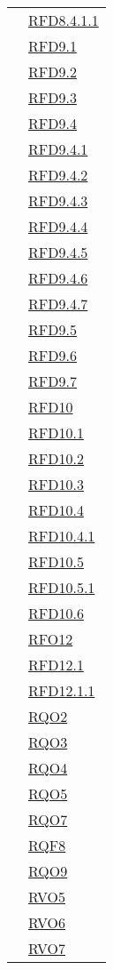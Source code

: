 \begin{longtable}{|>{\centering}m{5cm}|m{5cm}<{\centering}|}
& \hyperlink{RFD8.4.1.1}{RFD8.4.1.1}\\
& \hyperlink{RFD9.1}{RFD9.1}\\
& \hyperlink{RFD9.2}{RFD9.2}\\
& \hyperlink{RFD9.3}{RFD9.3}\\
& \hyperlink{RFD9.4}{RFD9.4}\\
& \hyperlink{RFD9.4.1}{RFD9.4.1}\\
& \hyperlink{RFD9.4.2}{RFD9.4.2}\\
& \hyperlink{RFD9.4.3}{RFD9.4.3}\\
& \hyperlink{RFD9.4.4}{RFD9.4.4}\\
& \hyperlink{RFD9.4.5}{RFD9.4.5}\\
& \hyperlink{RFD9.4.6}{RFD9.4.6}\\
& \hyperlink{RFD9.4.7}{RFD9.4.7}\\
& \hyperlink{RFD9.5}{RFD9.5}\\
& \hyperlink{RFD9.6}{RFD9.6}\\
& \hyperlink{RFD9.7}{RFD9.7}\\
& \hyperlink{RFD10}{RFD10}\\
& \hyperlink{RFD10.1}{RFD10.1}\\
& \hyperlink{RFD10.2}{RFD10.2}\\
& \hyperlink{RFD10.3}{RFD10.3}\\
& \hyperlink{RFD10.4}{RFD10.4}\\
& \hyperlink{RFD10.4.1}{RFD10.4.1}\\
& \hyperlink{RFD10.5}{RFD10.5}\\
& \hyperlink{RFD10.5.1}{RFD10.5.1}\\
& \hyperlink{RFD10.6}{RFD10.6}\\
& \hyperlink{RFO12}{RFO12}\\
& \hyperlink{RFD12.1}{RFD12.1}\\
& \hyperlink{RFD12.1.1}{RFD12.1.1}\\
& \hyperlink{RQO2}{RQO2}\\
& \hyperlink{RQO3}{RQO3}\\
& \hyperlink{RQO4}{RQO4}\\
& \hyperlink{RQO5}{RQO5}\\
& \hyperlink{RQO7}{RQO7}\\
& \hyperlink{RQF8}{RQF8}\\
& \hyperlink{RQO9}{RQO9}\\
& \hyperlink{RVO5}{RVO5}\\
& \hyperlink{RVO6}{RVO6}\\
& \hyperlink{RVO7}{RVO7}\\

\end{longtable}
